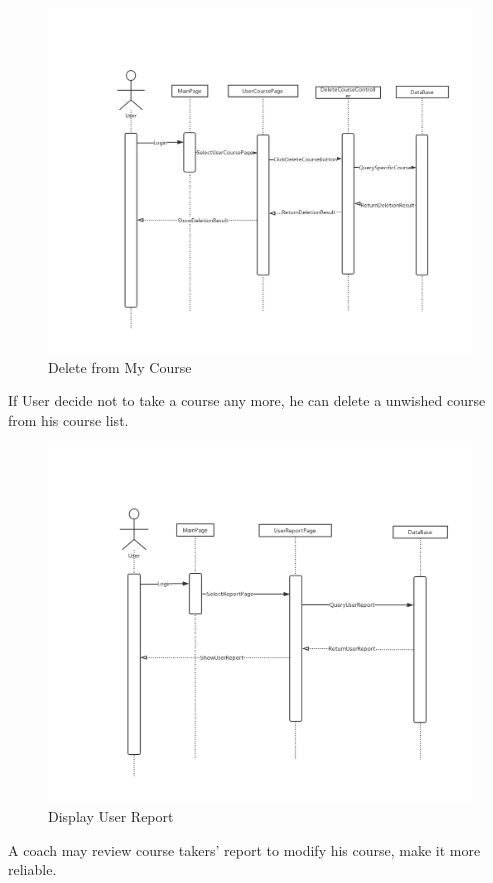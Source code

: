 \documentclass[16pt]{scrreprt}
\begin{document}
\begin{figure}[H]
    \includegraphics[width=\linewidth]{./FuncPhoto/11.png}   
    \caption{Delete from My Course}
\end{figure}
If User decide not to take a course any more, he can delete a unwished course from his course list.

\begin{figure}[H]
    \includegraphics[width=\linewidth]{./FuncPhoto/12.png}   
    \caption{Display User Report}
\end{figure}
A coach may review course takers' report to modify his course, make it more reliable.
\end{document}

